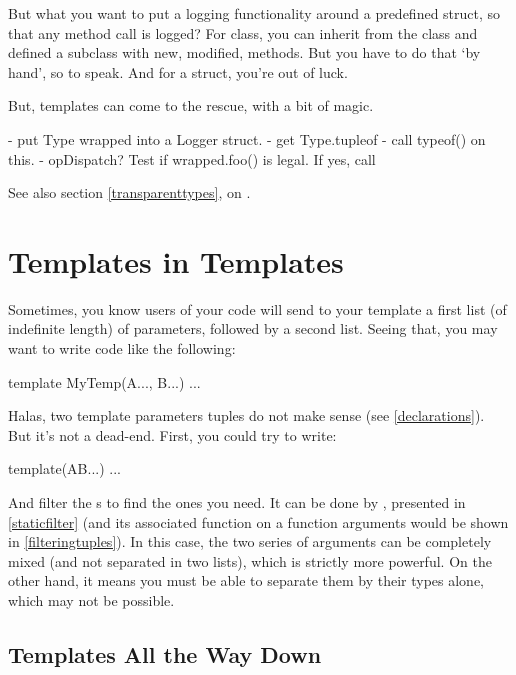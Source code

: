 But what you want to put a logging functionality around a predefined struct, so that any method call is logged? For class, you can inherit from the class and defined a subclass with new, modified, methods. But you have to do that `by hand', so to speak. And for a struct, you're out of luck.

But, templates can come to the rescue, with a bit of  magic.


- put Type wrapped into a Logger struct.
- get Type.tupleof
- call typeof() on this.
- opDispatch? Test if wrapped.foo() is legal. If yes, call


See also section \ref{transparenttypes}, on .

\section{Templates in Templates}\label{templatesintemplates}

Sometimes, you know users of your code will send to your template a first list (of indefinite length) of parameters, followed by a second list. Seeing that, you may want to write code like the following:

\begin{dcode}
template MyTemp(A..., B...)
{ ... }
\end{dcode}

Halas, two template parameters tuples do not make sense (see \autoref{declarations}). But it's not a dead-end. First, you could try to write:

\begin{dcode}
template(AB...)
{ ... }
\end{dcode}

And filter the s to find the ones you need. It can be done by , presented in \ref{staticfilter} (and its associated function on a function arguments would be  shown in \ref{filteringtuples}). In this case, the two series of arguments can be completely mixed (and not separated in two lists), which is strictly more powerful. On the other hand, it means you must be able to separate them by their types alone, which may not be possible.

\subsection{Templates All the Way Down}

